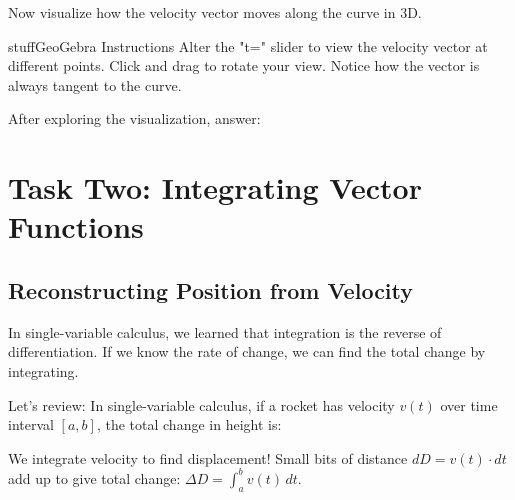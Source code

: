 \documentclass{ximera}
\begin{document}
\begin{problem}
Now visualize how the velocity vector moves along the curve in 3D.

\begin{expandable}{stuff}{GeoGebra Instructions}
    Alter the "t=" slider to view the velocity vector at different points. Click and drag to rotate your view. Notice how the vector is always tangent to the curve.
\end{expandable}

\begin{center}
\end{center}

After exploring the visualization, answer:
\begin{selectAll}
\end{selectAll}
\end{problem}

\section*{Task Two: Integrating Vector Functions}

\subsection*{Reconstructing Position from Velocity}

In single-variable calculus, we learned that integration is the reverse of differentiation. If we know the rate of change, we can find the total change by integrating.

\begin{problem}
Let's review: In single-variable calculus, if a rocket has velocity $v(t)$ over time interval $[a,b]$, the total change in height is:

\begin{multipleChoice}
\end{multipleChoice}

\begin{feedback}
We integrate velocity to find displacement! Small bits of distance $dD = v(t) \cdot dt$ add up to give total change: $\Delta D = \int_a^b v(t) \, dt$.
\end{feedback}
\end{problem}
\end{document}
